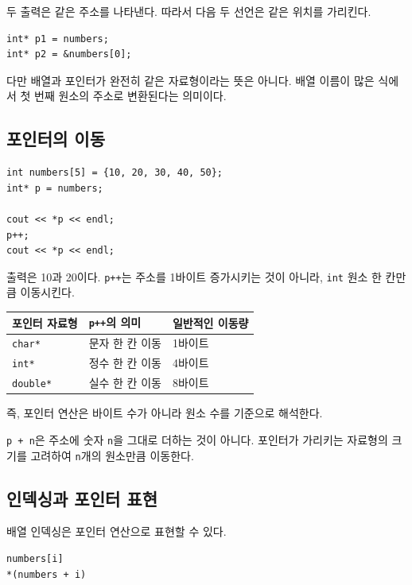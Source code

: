 \documentclass[11pt,a4paper]{article}
\begin{document}
두 출력은 같은 주소를 나타낸다. 따라서 다음 두 선언은 같은 위치를 가리킨다.

\begin{lstlisting}
int* p1 = numbers;
int* p2 = &numbers[0];
\end{lstlisting}

다만 배열과 포인터가 완전히 같은 자료형이라는 뜻은 아니다. 배열 이름이 많은 식에서 첫 번째 원소의 주소로 변환된다는 의미이다.

\subsection{포인터의 이동}

\begin{lstlisting}
int numbers[5] = {10, 20, 30, 40, 50};
int* p = numbers;

cout << *p << endl;
p++;
cout << *p << endl;
\end{lstlisting}

출력은 10과 20이다. \texttt{p++}는 주소를 1바이트 증가시키는 것이 아니라, \texttt{int} 원소 한 칸만큼 이동시킨다.

\begin{center}
\begin{tabular}{lll}
\toprule
포인터 자료형 & \texttt{p++}의 의미 & 일반적인 이동량 \\
\midrule
\texttt{char*} & 문자 한 칸 이동 & 1바이트 \\
\texttt{int*} & 정수 한 칸 이동 & 4바이트 \\
\texttt{double*} & 실수 한 칸 이동 & 8바이트 \\
\bottomrule
\end{tabular}
\end{center}

즉, 포인터 연산은 바이트 수가 아니라 원소 수를 기준으로 해석한다.

\begin{importantbox}
\texttt{p + n}은 주소에 숫자 \texttt{n}을 그대로 더하는 것이 아니다. 포인터가 가리키는 자료형의 크기를 고려하여 \texttt{n}개의 원소만큼 이동한다.
\end{importantbox}

\subsection{인덱싱과 포인터 표현}

배열 인덱싱은 포인터 연산으로 표현할 수 있다.

\begin{lstlisting}
numbers[i]
*(numbers + i)
\end{lstlisting}
\end{document}
